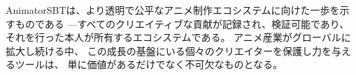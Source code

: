 AnimatorSBTは、より透明で公平なアニメ制作エコシステムに向けた一歩を示すものである
---すべてのクリエイティブな貢献が記録され、検証可能であり、
それを行った本人が所有するエコシステムである。
アニメ産業がグローバルに拡大し続ける中、
この成長の基盤にいる個々のクリエイターを保護し力を与えるツールは、
単に価値があるだけでなく不可欠なものとなる。
